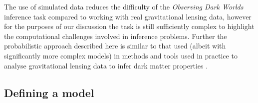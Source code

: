 The use of simulated data 
 reduces the difficulty of the \emph{Observing Dark Worlds} inference task compared to working with real gravitational lensing data, however for the purposes of our discussion the task is still sufficiently complex to highlight the computational challenges involved in inference problems. Further the probabilistic approach described here is similar to that used (albeit with significantly more complex models) in methods and tools used in practice to analyse gravitational lensing data to infer dark matter properties \citep{marshall2003bayesian,jullo2007bayesian}.



\subsection{Defining a model}

